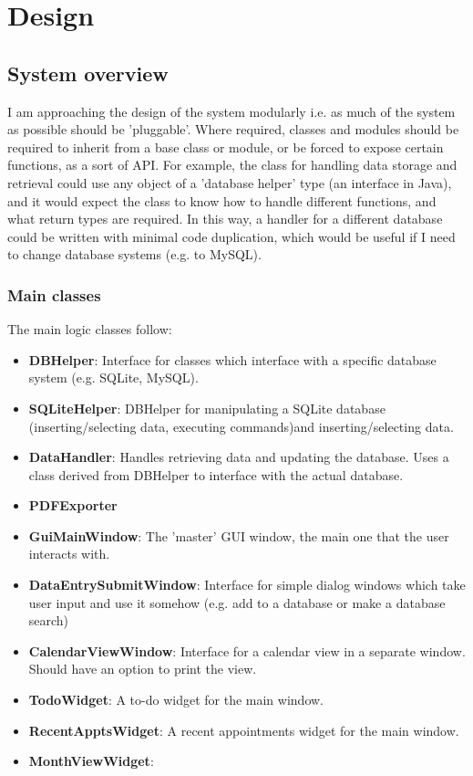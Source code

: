 \section{Design}
\subsection{System overview}

I am approaching the design of the system modularly i.e. as much of the system
as possible should be 'pluggable'. Where required, classes and modules should be
required to inherit from a base class or module, or be forced to expose certain
functions, as a sort of API. For example, the class for handling data storage
and retrieval could use any object of a 'database helper' type (an interface in
Java), and it would expect the class to know how to handle different functions,
and what return types are required. In this way, a handler for a different
database could be written with minimal code duplication, which would be useful
if I need to change database systems (e.g. to MySQL).

\subsubsection{Main classes}

\newcommand{\classitem}[1]{\item \textbf{#1}}

The main logic classes follow:

\begin{itemize}
    \classitem{DBHelper}: Interface for classes which interface with a specific
    database system (e.g. SQLite, MySQL).
    \classitem{SQLiteHelper}: DBHelper for manipulating a SQLite database
    (inserting/selecting data, executing commands)and inserting/selecting data.
    \classitem{DataHandler}: Handles retrieving data and updating the database.
    Uses a class derived from DBHelper to interface with the actual database.
    \classitem{PDFExporter}
\end{itemize}


\begin{itemize}
    \classitem{GuiMainWindow}: The 'master' GUI window, the main one that the
        user interacts with.
    \classitem{DataEntrySubmitWindow}: Interface for simple dialog windows
        which take user input and use it somehow (e.g. add to a database or make
        a database search)
    \classitem{CalendarViewWindow}: Interface for a calendar view in a separate
        window. Should have an option to print the view.
    \classitem{TodoWidget}: A to-do widget for the main window.
    \classitem{RecentApptsWidget}: A recent appointments widget for the main
    window.
    \classitem{MonthViewWidget}:
\end{itemize}


